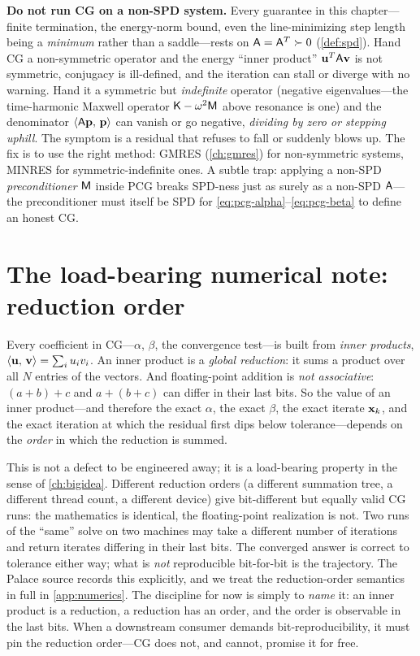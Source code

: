 \begin{pitfall}
\textbf{Do not run CG on a non-SPD system.} Every guarantee in this
chapter---finite termination, the energy-norm bound, even the line-minimizing step
length being a \emph{minimum} rather than a saddle---rests on
$\mathsf{A}=\mathsf{A}^{T}\succ0$ (\cref{def:spd}). Hand CG a non-symmetric operator and
the energy ``inner product'' $\mathbf{u}^{T}\mathsf{A}\mathbf{v}$ is not symmetric, conjugacy is
ill-defined, and the iteration can stall or diverge with no warning. Hand it a
symmetric but \emph{indefinite} operator (negative eigenvalues---the
time-harmonic Maxwell operator $\mathsf{K}-\omega^2\mathsf{M}$ above resonance is one)
and the denominator $\left\langle \mathsf{A}\mathbf{p},\, \mathbf{p}\right\rangle$ can vanish or go negative,
\emph{dividing by zero or stepping uphill}. The symptom is a residual that
refuses to fall or suddenly blows up. The fix is to use the right method: GMRES
(\cref{ch:gmres}) for non-symmetric systems, MINRES for symmetric-indefinite ones.
A subtle trap: applying a non-SPD \emph{preconditioner} $\mathsf{M}$ inside PCG
breaks SPD-ness just as surely as a non-SPD $\mathsf{A}$---the preconditioner must
itself be SPD for \eqref{eq:pcg-alpha}--\eqref{eq:pcg-beta} to define an honest CG.
\end{pitfall}

\section{The load-bearing numerical note: reduction order}
\label{sec:numerics}

Every coefficient in CG---$\alpha$, $\beta$, the convergence test---is built from
\emph{inner products}, $\left\langle \mathbf{u},\, \mathbf{v}\right\rangle=\sum_i u_i v_i$. An inner product is a
\emph{global reduction}: it sums a product over all $N$ entries of the vectors.
And floating-point addition is \emph{not associative}: $(a+b)+c$ and $a+(b+c)$ can
differ in their last bits. So the value of an inner product---and therefore the
exact $\alpha$, the exact $\beta$, the exact iterate $\mathbf{x}_k$, and the exact
iteration at which the residual first dips below tolerance---depends on the
\emph{order} in which the reduction is summed.

This is not a defect to be engineered away; it is a load-bearing property in the
sense of \cref{ch:bigidea}. Different reduction orders (a different summation tree,
a different thread count, a different device) give bit-different but equally valid
CG runs: the mathematics is identical, the floating-point realization is not. Two
runs of the ``same'' solve on two machines may take a different number of
iterations and return iterates differing in their last bits. The converged answer
is correct to tolerance either way; what is \emph{not} reproducible bit-for-bit is
the trajectory. The Palace source records this explicitly, and we treat the
reduction-order semantics in full in \cref{app:numerics}. The discipline for now is
simply to \emph{name} it: an inner product is a reduction, a reduction has an
order, and the order is observable in the last bits. When a downstream consumer
demands bit-reproducibility, it must pin the reduction order---CG does not, and
cannot, promise it for free.


